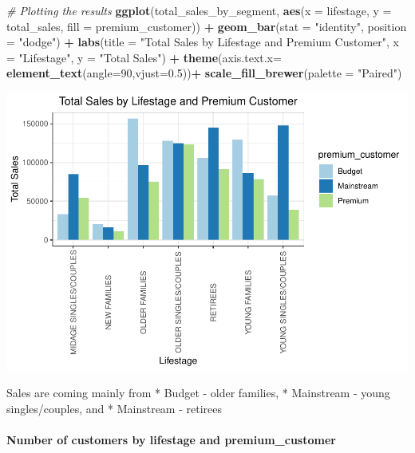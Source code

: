 \documentclass[
]{article}
\newenvironment{Shaded}{\begin{snugshade}}{\end{snugshade}}
\newcommand{\AttributeTok}[1]{\textcolor[rgb]{0.13,0.29,0.53}{#1}}
\newcommand{\CommentTok}[1]{\textcolor[rgb]{0.56,0.35,0.01}{\textit{#1}}}
\newcommand{\DecValTok}[1]{\textcolor[rgb]{0.00,0.00,0.81}{#1}}
\newcommand{\FloatTok}[1]{\textcolor[rgb]{0.00,0.00,0.81}{#1}}
\newcommand{\FunctionTok}[1]{\textcolor[rgb]{0.13,0.29,0.53}{\textbf{#1}}}
\newcommand{\NormalTok}[1]{#1}
\newcommand{\SpecialCharTok}[1]{\textcolor[rgb]{0.81,0.36,0.00}{\textbf{#1}}}
\newcommand{\StringTok}[1]{\textcolor[rgb]{0.31,0.60,0.02}{#1}}
\begin{document}
\begin{Shaded}
\begin{Highlighting}[]
\CommentTok{\# Plotting the results}
\FunctionTok{ggplot}\NormalTok{(total\_sales\_by\_segment, }\FunctionTok{aes}\NormalTok{(}\AttributeTok{x =}\NormalTok{ lifestage, }\AttributeTok{y =}\NormalTok{ total\_sales, }\AttributeTok{fill =}\NormalTok{ premium\_customer)) }\SpecialCharTok{+}
  \FunctionTok{geom\_bar}\NormalTok{(}\AttributeTok{stat =} \StringTok{"identity"}\NormalTok{, }\AttributeTok{position =} \StringTok{"dodge"}\NormalTok{) }\SpecialCharTok{+}
  \FunctionTok{labs}\NormalTok{(}\AttributeTok{title =} \StringTok{"Total Sales by Lifestage and Premium Customer"}\NormalTok{,}
       \AttributeTok{x =} \StringTok{"Lifestage"}\NormalTok{,}
       \AttributeTok{y =} \StringTok{"Total Sales"}\NormalTok{) }\SpecialCharTok{+}
  \FunctionTok{theme}\NormalTok{(}\AttributeTok{axis.text.x=} \FunctionTok{element\_text}\NormalTok{(}\AttributeTok{angle=}\DecValTok{90}\NormalTok{,}\AttributeTok{vjust=}\FloatTok{0.5}\NormalTok{))}\SpecialCharTok{+}
  \FunctionTok{scale\_fill\_brewer}\NormalTok{(}\AttributeTok{palette =} \StringTok{"Paired"}\NormalTok{)}
\end{Highlighting}
\end{Shaded}

\begin{center}\includegraphics{quantium_analysis_files/figure-latex/unnamed-chunk-29-1} \end{center}

Sales are coming mainly from * Budget - older families, * Mainstream -
young singles/couples, and * Mainstream - retirees

\hypertarget{number-of-customers-by-lifestage-and-premium_customer}{%
\paragraph{Number of customers by lifestage and
premium\_customer}\label{number-of-customers-by-lifestage-and-premium_customer}}
\end{document}
